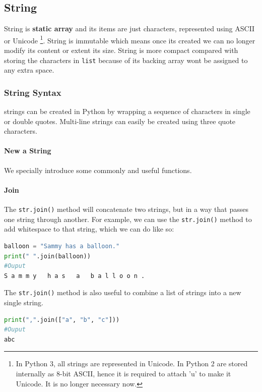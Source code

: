 \documentclass[../main.tex]{subfiles}
\begin{document}
\subsection{String}
String is \textbf{static array} and its items are just characters, represented using  ASCII or Unicode \footnote{In Python 3, all strings are represented in Unicode. In Python 2 are stored internally as 8-bit ASCII, hence it is required to attach 'u' to make it Unicode. It is no longer necessary now.}. String is immutable which means once its created we can no longer modify its content or extent its size. String is more compact compared with storing the characters in \texttt{list} because of its backing array wont be assigned to any extra space.

\subsubsection{String Syntax} strings can be created in Python by wrapping a sequence of characters in single or double quotes. Multi-line strings can easily be created using three quote characters.

\paragraph{New a String}


We specially introduce some commonly and useful functions. 
\paragraph{Join}
The \texttt{str.join()} method will concatenate two strings, but in a way that passes one string through another.  For example, we can  use the \texttt{str.join()} method to add whitespace to that string, which we can do like so:
\begin{lstlisting}[language=Python]
balloon = "Sammy has a balloon."
print(" ".join(balloon))
#Ouput
S a m m y   h a s   a   b a l l o o n .
\end{lstlisting}
The \texttt{str.join()} method is also useful to combine a list of strings into a new single string.
\begin{lstlisting}[language=Python]
print(",".join(["a", "b", "c"]))
#Ouput
abc
\end{lstlisting}
\end{document}

